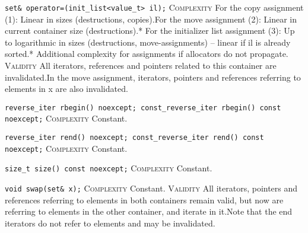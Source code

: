 \noindent{}\hspace*{0.25em}\lstinline[basicstyle=\ttfamily\color{corange}]{set& operator=(init_list<value_t> il);} \textsc{Complexity} For the copy assignment (1): Linear in sizes (destructions, copies).For the move assignment (2): Linear in current container size (destructions).* For the initializer list assignment (3): Up to logarithmic in sizes (destructions, move-assignments) -- linear if il is already sorted.* Additional complexity for assignments if allocators do not propagate. \textsc{Validity} All iterators, references and pointers related to this container are invalidated.In the move assignment, iterators, pointers and references referring to elements in x are also invalidated.\\\vspace{-0.6em}

\noindent{}\hspace*{0.25em}\lstinline[basicstyle=\ttfamily\color{cgreen}]{reverse_iter rbegin() noexcept; const_reverse_iter rbegin() const noexcept;} \textsc{Complexity} Constant.\\\vspace{-0.6em}

\noindent{}\hspace*{0.25em}\lstinline[basicstyle=\ttfamily\color{cgreen}]{reverse_iter rend() noexcept; const_reverse_iter rend() const noexcept;} \textsc{Complexity} Constant.\\\vspace{-0.6em}

\noindent{}\hspace*{0.25em}\lstinline[basicstyle=\ttfamily\color{cgreen}]{size_t size() const noexcept;} \textsc{Complexity} Constant.\\\vspace{-0.6em}

\noindent{}\hspace*{0.25em}\lstinline[basicstyle=\ttfamily\color{cgreen}]{void swap(set& x);} \textsc{Complexity} Constant. \textsc{Validity} All iterators, pointers and references referring to elements in both containers remain valid, but now are referring to elements in the other container, and iterate in it.Note that the end iterators do not refer to elements and may be invalidated.\\\vspace{-0.6em}


